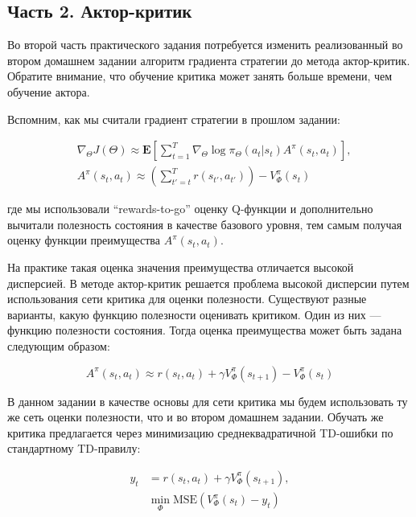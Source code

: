 \documentclass[12pt, oneside]{article}
\begin{document}
\subsection{Часть 2. Актор-критик}

Во второй часть практического задания потребуется изменить реализованный во втором домашнем задании алгоритм градиента стратегии до метода актор-критик. Обратите внимание, что обучение критика может занять больше времени, чем обучение актора.

Вспомним, как мы считали градиент стратегии в прошлом задании:

\begin{align}
    &\nabla_{\Theta} J(\Theta) \approx \mathbf{E} \left[ \sum_{t=1}^T \nabla_{\Theta} \log \pi_{\Theta} (a_t | s_t) A^{\pi}(s_t, a_t) \right], \\
    &A^{\pi}(s_t, a_t) \approx \left( \sum_{t'=t}^T r(s_{t'}, a_{t'}) \right) - V_{\Phi}^{\pi}(s_t)
\end{align}

\noindent
где мы использовали ``rewards-to-go'' оценку Q-функции и дополнительно вычитали полезность состояния в качестве базового уровня, тем самым получая оценку функции преимущества $A^{\pi}(s_t, a_t)$.

На практике такая оценка значения преимущества отличается высокой дисперсией. В методе актор-критик решается проблема высокой дисперсии путем использования сети критика для оценки полезности. Существуют разные варианты, какую функцию полезности оценивать критиком. Один из них --- функцию полезности состояния. Тогда оценка преимущества может быть задана следующим образом:

\begin{equation}
    A^{\pi}(s_t, a_t) \approx r(s_t, a_t) + \gamma V_{\Phi}^{\pi}(s_{t+1}) - V_{\Phi}^{\pi}(s_t)
\end{equation}

В данном задании в качестве основы для сети критика мы будем использовать ту же сеть оценки полезности, что и во втором домашнем задании. Обучать же критика предлагается через минимизацию среднеквадратичной TD-ошибки по стандартному TD-правилу:

\begin{align}
    y_t &= r(s_t, a_t) + \gamma V_{\Phi}^{\pi}(s_{t+1}), \\
    &\min_{\Phi} \text{MSE} (V_{\Phi}^{\pi}(s_t) - y_t)
\end{align}
\end{document}
